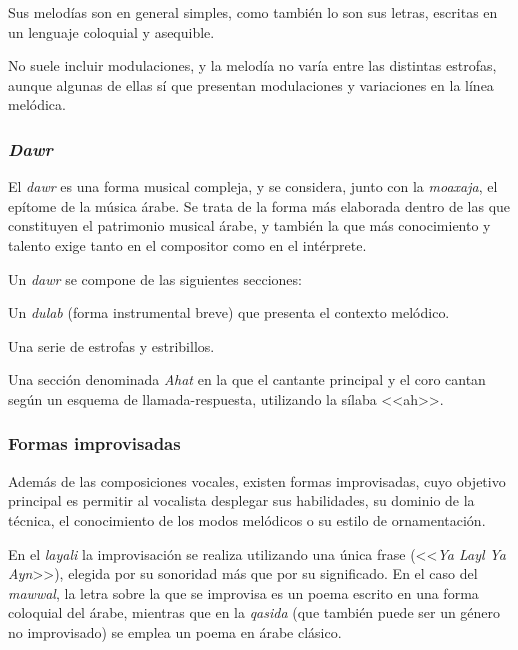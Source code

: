     Sus melodías son en general simples, como también lo son sus letras, escritas en un lenguaje coloquial y asequible.

    No suele incluir modulaciones, y la melodía no varía entre las distintas estrofas, aunque algunas de ellas sí que presentan modulaciones y variaciones en la línea melódica.


    \subsubsection{\emph{Dawr}}

    El \emph{dawr} es una forma musical compleja, y se considera, junto con la \emph{moaxaja}, el epítome de la música árabe. Se trata de la forma más elaborada dentro de las que constituyen el patrimonio musical árabe, y también la que más conocimiento y talento exige tanto en el compositor como en el intérprete.

    Un \emph{dawr} se compone de las siguientes secciones:

    \begin{compactitem}
      \item Un \emph{dulab} (forma instrumental breve) que presenta el contexto melódico.
      \item Una serie de estrofas y estribillos.
      \item Una sección denominada \emph{Ahat} en la que el cantante principal y el coro cantan según un esquema de llamada-respuesta, utilizando la sílaba <<ah>>.
    \end{compactitem}


    \subsubsection{Formas improvisadas}

    Además de las composiciones vocales, existen formas improvisadas, cuyo objetivo principal es permitir al vocalista desplegar sus habilidades, su dominio de la técnica, el conocimiento de los modos melódicos o su estilo de ornamentación.

    En el \emph{layali} la improvisación se realiza utilizando una única frase (<<\emph{Ya Layl Ya Ayn}>>), elegida por su sonoridad más que por su significado. En el caso del \emph{mawwal}, la letra sobre la que se improvisa es un poema escrito en una forma coloquial del árabe, mientras que en la \emph{qasida} (que también puede ser un género no improvisado) se emplea un poema en árabe clásico.

